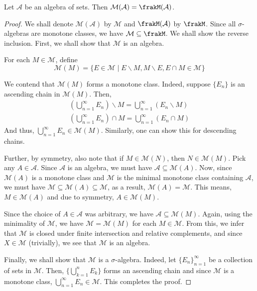 \begin{theorem}
    Let $\mathcal A$ be an algebra of sets. Then $\mathcal M(\mathcal A) = \frakM(\mathcal A)$.
\end{theorem}
\begin{proof}
    We shall denote $\mathcal M(\mathcal A)$ by $\mathcal M$ and $\frakM(\mathcal A)$ by $\frakM$. Since all $\sigma$-algebras are monotone classes, we have $\mathcal M\subseteq\frakM$. We shall show the reverse inclusion. First, we shall show that $\mathcal M$ is an algebra.

    For each $M\in\mathcal M$, define 
    \begin{equation*}
        \mathcal M(M) = \{E\in\mathcal M\mid E\backslash M, M\backslash E, E\cap M\in\mathcal M\}
    \end{equation*}

    We contend that $\mathcal M(M)$ forms a monotone class. Indeed, suppose $\{E_n\}$ is an ascending chain in $\mathcal M(M)$. Then, 
    \begin{align*}
        \left(\bigcup_{n = 1}^\infty E_n\right)\backslash M = \bigcup_{n = 1}^\infty(E_n\backslash M)\\
        \left(\bigcup_{n = 1}^\infty E_n\right)\cap M = \bigcup_{n = 1}^\infty(E_n\cap M)
    \end{align*}
    And thus, $\bigcup\limits_{n = 1}^\infty E_n\in\mathcal M(M)$. Similarly, one can show this for descending chains.

    Further, by symmetry, also note that if $M\in\mathcal M(N)$, then $N\in\mathcal M(M)$. Pick any $A\in\mathcal A$. Since $\mathcal A$ is an algebra, we must have $\mathcal A\subseteq\mathcal M(A)$. Now, since $\mathcal M(A)$ is a monotone class and $\mathcal M$ is the minimal monotone class containing $\mathcal A$, we must have $\mathcal M\subseteq\mathcal M(A)\subseteq\mathcal M$, as a result, $\mathcal M(A) = \mathcal M$. This means, $M\in\mathcal M(A)$ and due to symmetry, $A\in\mathcal M(M)$. 

    Since the choice of $A\in\mathcal A$ was arbitrary, we have $\mathcal A\subseteq\mathcal M(M)$. Again, using the minimality of $\mathcal M$, we have $\mathcal M = \mathcal M(M)$ for each $M\in\mathcal M$. From this, we infer that $\mathcal M$ is closed under finite intersection and relative complements, and since $X\in\mathcal M$ (trivially), we see that $\mathcal M$ is an algebra.

    Finally, we shall show that $\mathcal M$ is a $\sigma$-algebra. Indeed, let $\{E_n\}_{n = 1}^\infty$ be a collection of sets in $\mathcal M$. Then, $\{\bigcup_{k = 1}^n E_k\}$ forms an ascending chain and since $\mathcal M$ is a monotone class, $\bigcup\limits_{n = 1}^\infty E_n\in\mathcal M$. This completes the proof.
\end{proof}

